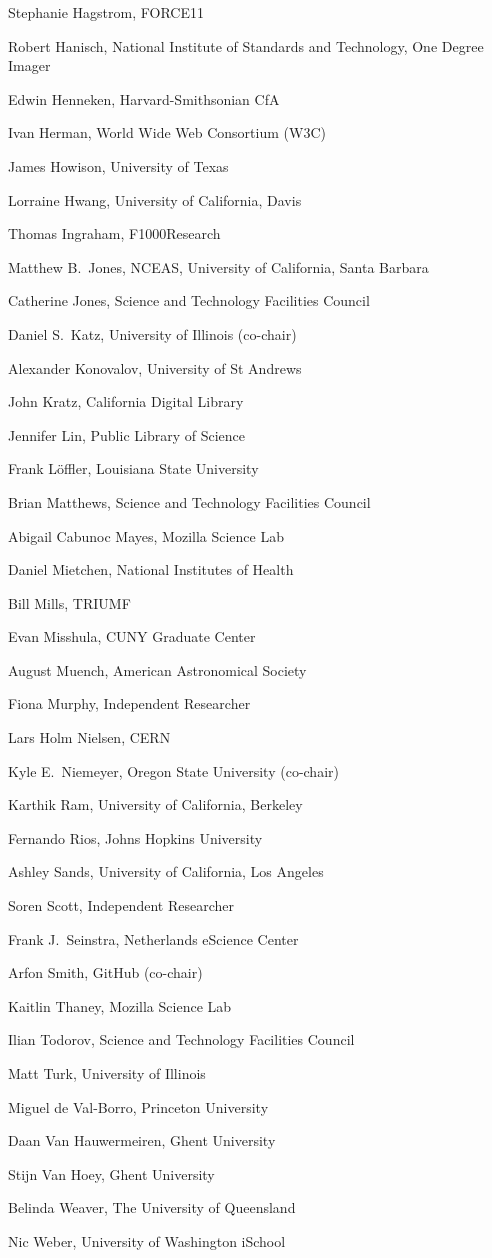 \documentclass[11pt, oneside]{amsart}
\begin{document}
Stephanie Hagstrom, FORCE11

Robert Hanisch, National Institute of Standards and Technology, One Degree Imager

Edwin Henneken, Harvard-Smithsonian CfA

Ivan Herman, World Wide Web Consortium (W3C)

James Howison, University of Texas

Lorraine Hwang, University of California,  Davis

Thomas Ingraham, F1000Research

Matthew B.~Jones, NCEAS, University of California,  Santa Barbara

Catherine Jones, Science and Technology Facilities Council

Daniel S.~Katz, University of Illinois (co-chair)

Alexander Konovalov, University of St Andrews

John Kratz, California Digital Library

Jennifer Lin, Public Library of Science

Frank L\"offler, Louisiana State University

Brian Matthews, Science and Technology Facilities Council

Abigail Cabunoc Mayes, Mozilla Science Lab

Daniel Mietchen, National Institutes of Health

Bill Mills, TRIUMF

Evan Misshula, CUNY Graduate Center

August Muench, American Astronomical Society

Fiona Murphy, Independent Researcher

Lars Holm Nielsen, CERN

Kyle E.~Niemeyer, Oregon State University (co-chair)

Karthik Ram, University of California, Berkeley

Fernando Rios, Johns Hopkins University

Ashley Sands, University of California, Los Angeles

Soren Scott, Independent Researcher

Frank J.~Seinstra, Netherlands eScience Center

Arfon Smith, GitHub (co-chair)

Kaitlin Thaney, Mozilla Science Lab

Ilian Todorov, Science and Technology Facilities Council

Matt Turk, University of Illinois

Miguel de Val-Borro, Princeton University

Daan Van Hauwermeiren, Ghent University

Stijn Van Hoey, Ghent University

Belinda Weaver, The University of Queensland

Nic Weber, University of Washington iSchool



\end{document}
